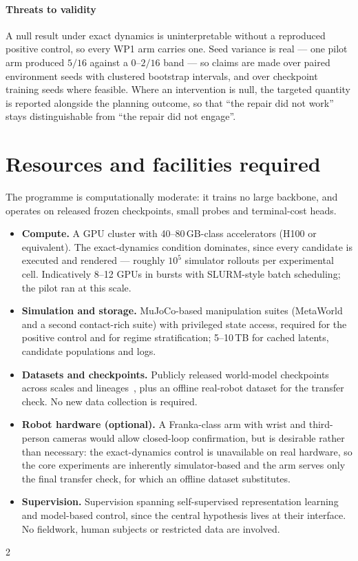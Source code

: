 \documentclass[11pt,letterpaper]{article}
\begin{document}
\paragraph{Threats to validity} A null result under exact dynamics is
uninterpretable without a reproduced positive control, so every WP1 arm carries
one. Seed variance is real --- one pilot arm produced $5/16$ against a
$0$--$2/16$ band --- so claims are made over paired environment seeds with
clustered bootstrap intervals, and over checkpoint training seeds where
feasible. Where an intervention is null, the targeted quantity is reported
alongside the planning outcome, so that ``the repair did not work'' stays
distinguishable from ``the repair did not engage''.

\section{Resources and facilities required}

The programme is computationally moderate: it trains no large backbone, and
operates on released frozen checkpoints, small probes and terminal-cost heads.
\begin{itemize}[leftmargin=1.2em]
\item \textbf{Compute.} A GPU cluster with 40--80\,GB-class accelerators (H100
or equivalent). The exact-dynamics condition dominates, since every candidate is
executed and rendered --- roughly $10^{5}$ simulator rollouts per experimental
cell. Indicatively 8--12 GPUs in bursts with SLURM-style batch scheduling; the
pilot ran at this scale.
\item \textbf{Simulation and storage.} MuJoCo-based manipulation suites
(MetaWorld~\citep{yu2020metaworld} and a second contact-rich suite) with
privileged state access, required for the positive control and for regime
stratification; 5--10\,TB for cached latents, candidate populations and logs.
\item \textbf{Datasets and checkpoints.} Publicly released world-model
checkpoints across scales and lineages~\citep{zhou2024dinowm,jepawms2025,
assran2025vjepa2,murlabadia2026vjepa21}, plus an offline real-robot dataset for
the transfer check. No new data collection is required.
\item \textbf{Robot hardware (optional).} A Franka-class arm with wrist and
third-person cameras would allow closed-loop confirmation, but is desirable
rather than necessary: the exact-dynamics control is unavailable on real
hardware, so the core experiments are inherently simulator-based and the arm
serves only the final transfer check, for which an offline dataset substitutes.
\item \textbf{Supervision.} Supervision spanning self-supervised representation
learning and model-based control, since the central hypothesis lives at their
interface. No fieldwork, human subjects or restricted data are involved.
\end{itemize}

{\setlength{\columnsep}{12pt}\setlength{\bibsep}{0pt}\setlength{\bibhang}{1em}%
\begin{multicols}{2}\raggedright\fontsize{7.2}{8.3}\selectfont


\end{multicols}}
\end{document}
